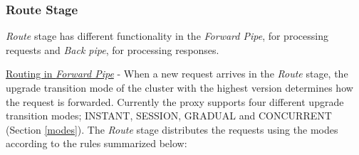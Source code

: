 \documentclass[a4paper,11pt,twoside]{report}
\begin{document}
\subsubsection*{Route Stage} \label{route-stage} 
\textit{Route} stage has different functionality in the \textit{Forward Pipe}, for processing requests and \textit{Back pipe}, for processing responses. \bigskip  

\noindent
\underline{Routing in \textit{Forward Pipe}} - When a new request arrives in the \textit{Route} stage, the upgrade transition mode of the cluster with the highest version determines how the request is forwarded. Currently the proxy supports four different upgrade transition modes; INSTANT, SESSION, GRADUAL and CONCURRENT (Section \ref{modes}). The \textit{Route} stage distributes the requests using the modes according to the rules summarized below: 
\end{document}
